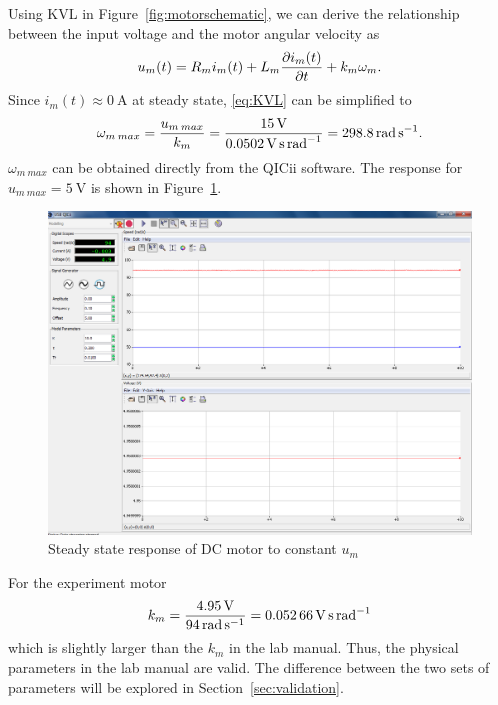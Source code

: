 Using KVL in Figure~\ref{fig:motorschematic}, we can derive the relationship between the input voltage and the motor angular velocity as
\begin{equation}\label{eq:KVL}
  u_m(t) = R_m i_m(t) + L_m \pdv{i_m(t)}{t} + k_m \omega_m.
\end{equation}
Since $i_m(t) \approx \SI{0}{\ampere}$ at steady state, \eqref{eq:KVL} can be simplified to
\begin{equation*}
  \omega_{m\>max} = {u_{m\>max} \over k_m} = {\SI{15}{\volt} \over \SI{0.0502}{\volt\second\per\radian}} = \SI{298.8}{\radian\per\second}.
\end{equation*}
$\omega_{m\>max}$ can be obtained directly from the QICii software.
The response for $u_{m\>max} = \SI{5}{\volt}$ is shown in Figure~\ref{fig:wmax}.
\begin{figure}[t!]
  \centering
  \includegraphics[width=0.95\linewidth]{graphics/part2}
  \caption{Steady state response of DC motor to constant $u_m$}
  \label{fig:wmax}
\end{figure}

\pagebreak
For the experiment motor
\begin{equation*}
  k_m = {\SI{4.95}{\volt} \over \SI{94}{\radian\per\second}} = \SI{0.05266}{\volt\second\per\radian}
\end{equation*}
which is slightly larger than the $k_m$ in the lab manual.
Thus, the physical parameters in the lab manual are valid.
The difference between the two sets of parameters will be explored in Section~\ref{sec:validation}.


